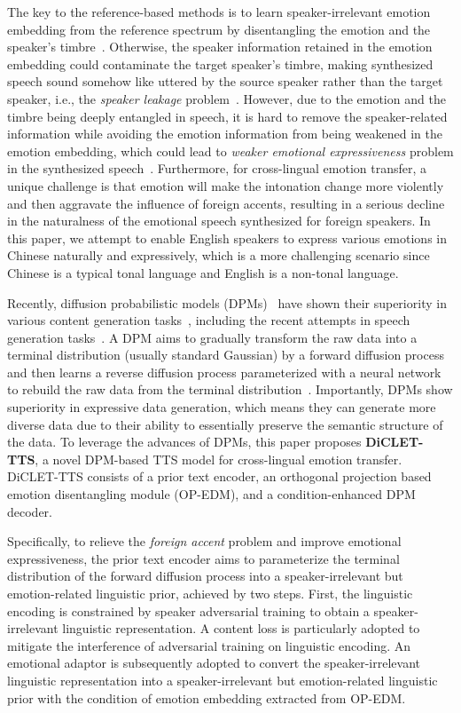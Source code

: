 \documentclass[journal,comsoc]{IEEEtran}
\begin{document}
The key to the reference-based methods is to learn speaker-irrelevant emotion embedding from the reference spectrum by disentangling the emotion and the speaker's timbre~\cite{Bian2019Multi,2019Multi,Li2021ControllableCE}.
Otherwise, the speaker information retained in the emotion embedding could contaminate the target speaker's timbre, making synthesized speech sound somehow like uttered by the source speaker rather than the target speaker, i.e., the \textit{speaker leakage} problem~\cite{Karlapati2020CopyCatMF}. 
However, due to the emotion and the timbre being deeply entangled in speech, it is hard to remove the speaker-related information while avoiding the emotion information from being weakened in the emotion embedding, which could lead to \textit{weaker emotional expressiveness} problem in the synthesized speech~\cite{li22h_interspeech}. 
Furthermore, for cross-lingual emotion transfer, a unique challenge is that emotion will make the intonation change more violently and then aggravate the influence of foreign accents, resulting in a serious decline in the naturalness of the emotional speech synthesized for foreign speakers.
In this paper, we attempt to enable English speakers to express various emotions in Chinese naturally and expressively, which is a more challenging scenario since Chinese is a typical tonal language and English is a non-tonal language.

Recently, diffusion probabilistic models (DPMs)~\cite{sohl2015deep,song2020score} have shown their superiority in various content generation tasks~\cite{song2020denoising,rombach2022high,kawar2022denoising}, including the recent attempts in speech generation tasks~\cite{popov2021grad,chen2021wavegrad,jeong2021diff,huang2022fastdiff}.
A DPM aims to gradually transform the raw data into a terminal distribution (usually standard Gaussian) by a forward diffusion process and then learns a reverse diffusion process parameterized with a neural network to rebuild the raw data from the terminal distribution~\cite{sohl2015deep}. 
Importantly, DPMs show superiority in expressive data generation, which means they can generate more diverse data due to their ability to essentially preserve the semantic structure of the data.
To leverage the advances of DPMs, this paper proposes \textbf{DiCLET-TTS}, a novel DPM-based TTS model for cross-lingual emotion transfer.
DiCLET-TTS consists of a prior text encoder, an orthogonal projection based emotion disentangling module (OP-EDM), and a condition-enhanced DPM decoder. 

Specifically, to relieve the \textit{foreign accent} problem and improve emotional expressiveness, the prior text encoder aims to parameterize the terminal distribution of the forward diffusion process into a speaker-irrelevant but emotion-related linguistic prior, achieved by two steps.
First, the linguistic encoding is constrained by speaker adversarial training to obtain a speaker-irrelevant linguistic representation. 
A content loss is particularly adopted to mitigate the interference of adversarial training on linguistic encoding.
An emotional adaptor is subsequently adopted to convert the speaker-irrelevant linguistic representation into a speaker-irrelevant but emotion-related linguistic prior with the condition of emotion embedding extracted from OP-EDM. 
\end{document}
